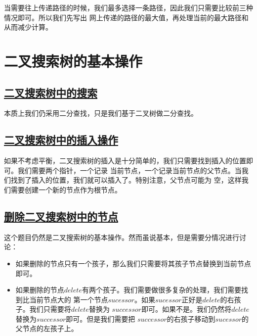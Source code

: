 \documentclass[../../main.tex]{subfiles}
\begin{document}
当需要往上传递路径的时候，我们最多选择一条路径，因此我们只需要比较前三种情况即可。所以我们先写出
网上传递的路径的最大值，再处理当前的最大路径和从而减少计算。



\section{二叉搜索树的基本操作}

\subsection{\href{https://leetcode-cn.com/problems/search-in-a-binary-search-tree/}
{二叉搜索树中的搜索}}

本质上我们仍采用二分查找，只是我们基于二叉树做二分查找。



\subsection{\href{https://leetcode-cn.com/problems/insert-into-a-binary-search-tree/}
{二叉搜索树中的插入操作}}

如果不考虑平衡，二叉搜索树的插入是十分简单的，我们只需要找到插入的位置即可。我们需要两个指针，一个记录
当前节点，一个记录当前节点的父节点。当我们找到了插入的位置，我们就可以插入了。特别注意，父节点可能为
空，这样我们需要创建一个新的节点作为根节点。



\subsection{\href{https://leetcode-cn.com/problems/delete-node-in-a-bst/}
{删除二叉搜索树中的节点}}

这个题目仍然是二叉搜索树的基本操作。然而虽说基本，但是需要分情况进行讨论：

\begin{itemize}
  \item 如果删除的节点只有一个孩子，那么我们只需要将其孩子节点替换到当前节点即可。
  \item 如果删除的节点$delete$有两个孩子。我们需要做很多复杂的处理，我们需要找到比当前节点大的
  第一个节点$sucessor$。如果$sucessor$正好是$delete$的右孩子。我们只需要将$delete$替换为
  $successor$即可。如果不是。我们仍然将$delete$替换为$successor$即可。但是我们需要把
  $successor$的右孩子移动到$sucessor$的父节点的左孩子上。
\end{itemize}
\end{document}
